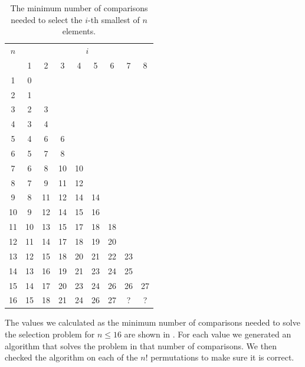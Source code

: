 \documentclass[twoside,leqno,twocolumn]{article}
\begin{document}
\begin{table}[!t]
  \renewcommand{\arraystretch}{1.2}
  \caption{The minimum number of comparisons needed to select the $i$-th smallest of $n$ elements.}
  \label{table:num-comparisons}
  \centering
  \begin{tabular}{c|cccccccc}
    $n$ & \multicolumn{8}{c}{$i$}                                    \\
        & 1                       & 2  & 3  & 4  & 5  & 6  & 7  & 8  \\ \hline
    1   & 0                                                          \\
    2   & 1                                                          \\
    3   & 2                       & 3                                \\
    4   & 3                       & 4                                \\
    5   & 4                       & 6  & 6                           \\
    6   & 5                       & 7  & 8                           \\
    7   & 6                       & 8  & 10 & 10                     \\
    8   & 7                       & 9  & 11 & 12                     \\
    9   & 8                       & 11 & 12 & 14 & 14                \\
    10  & 9                       & 12 & 14 & 15 & 16                \\
    11  & 10                      & 13 & 15 & 17 & 18 & 18           \\
    12  & 11                      & 14 & 17 & 18 & 19 & 20           \\
    13  & 12                      & 15 & 18 & 20 & 21 & 22 & 23      \\
    14  & 13                      & 16 & 19 & 21 & 23 & 24 & 25      \\
    15  & 14                      & 17 & 20 & 23 & 24 & 26 & 26 & 27 \\
    16  & 15                      & 18 & 21 & 24 & 26 & 27 & ?  & ?  \\
  \end{tabular}
\end{table}

The values we calculated as the minimum number of comparisons needed to solve the selection problem for $n \leq 16$ are shown in .
For each value we generated an algorithm that solves the problem in that number of comparisons.
We then checked the algorithm on each of the $n!$ permutations to make sure it is correct.
\end{document}
